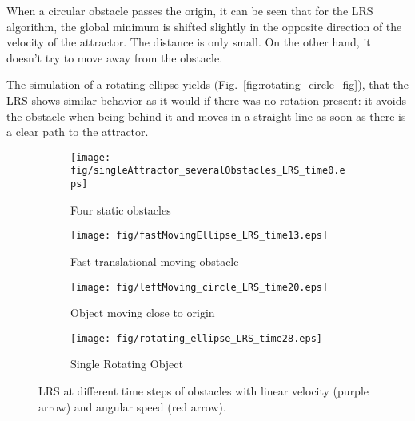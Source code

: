 When a circular obstacle passes the origin, it can be seen that for the LRS algorithm, the global minimum is shifted slightly in the opposite direction of the velocity of the attractor. The distance is only small. On the other hand, it doesn't try to move away from the obstacle.

The simulation of a rotating ellipse yields (Fig.~\ref{fig:rotating_circle_fig}), that the LRS shows similar behavior as it would if there was no rotation present: it avoids the obstacle when being behind it and moves in a straight line as soon as there is a clear path to the attractor.

\begin{figure}[tb]\centering
\begin{subfigure}{.48\columnwidth} %
 \centering
\texttt{[image: fig/singleAttractor\_severalObstacles\_LRS\_time0.eps]}
\caption{Four static obstacles}
\label{fig:singleAttractor_severalObstacles_LRS_time0}
\end{subfigure}%
\begin{subfigure}{.48\columnwidth} %
\centering
\texttt{[image: fig/fastMovingEllipse\_LRS\_time13.eps]}
\caption{Fast translational moving obstacle}
\label{fig:fastMovingEllipse_LRS_time0}
\end{subfigure}

\begin{subfigure}{.48\columnwidth} %
\centering
\texttt{[image: fig/leftMoving\_circle\_LRS\_time20.eps]}
\caption{Object moving close to origin}
\label{fig:leftMoving_circle_LRS_time2}
\end{subfigure}%
\begin{subfigure}{.48\columnwidth} %
\centering
\texttt{[image: fig/rotating\_ellipse\_LRS\_time28.eps]}
\caption{Single Rotating Object}
\label{fig:rotating_ellipse_LRS_time0}
\end{subfigure}
\caption{LRS at different time steps of obstacles with linear velocity (purple arrow) and angular speed (red arrow). }
\label{fig:twoMovingRotatingObs_LRS}
\end{figure}

